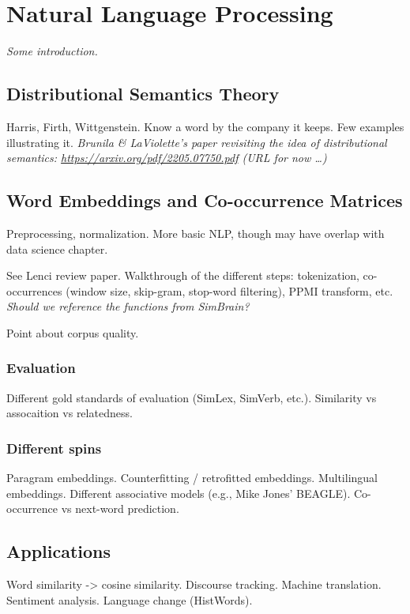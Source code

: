 \chapter{Natural Language Processing}\label{ch_nlp}

\textit{Some introduction.}

\section{Distributional Semantics Theory}
Harris, Firth, Wittgenstein.
Know a word by the company it keeps.
Few examples illustrating it.
\textit{Brunila \& LaViolette's paper revisiting the idea of distributional semantics: \url{https://arxiv.org/pdf/2205.07750.pdf} (URL for now \dots)}

\section{Word Embeddings and Co-occurrence Matrices}
Preprocessing, normalization.
More basic NLP, though may have overlap with data science chapter. 

See Lenci review paper.
Walkthrough of the different steps: tokenization, co-occurrences (window size, skip-gram, stop-word filtering), PPMI transform, etc.
\textit{Should we reference the functions from SimBrain?}

Point about corpus quality.

\subsection{Evaluation}
Different gold standards of evaluation (SimLex, SimVerb, etc.).
Similarity vs assocaition vs relatedness.

\subsection{Different spins}
Paragram embeddings.
Counterfitting / retrofitted embeddings.
Multilingual embeddings.
Different associative models (e.g., Mike Jones' BEAGLE).
Co-occurrence vs next-word prediction.

\section{Applications}
Word similarity -> cosine similarity.
Discourse tracking.
Machine translation.
Sentiment analysis.
Language change (HistWords).

